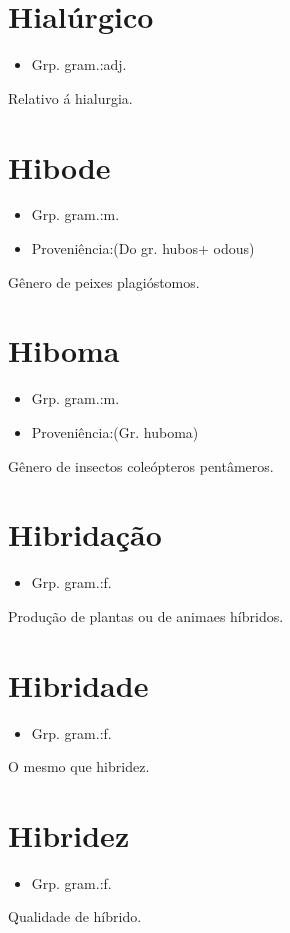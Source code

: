 \documentclass{article}
\begin{document}
\section{Hialúrgico}
\begin{itemize}
\item {Grp. gram.:adj.}
\end{itemize}
Relativo á hialurgia.
\section{Hibode}
\begin{itemize}
\item {Grp. gram.:m.}
\end{itemize}
\begin{itemize}
\item {Proveniência:(Do gr. \textunderscore hubos\textunderscore  + \textunderscore odous\textunderscore )}
\end{itemize}
Gênero de peixes plagióstomos.
\section{Hiboma}
\begin{itemize}
\item {Grp. gram.:m.}
\end{itemize}
\begin{itemize}
\item {Proveniência:(Gr. \textunderscore huboma\textunderscore )}
\end{itemize}
Gênero de insectos coleópteros pentâmeros.
\section{Hibridação}
\begin{itemize}
\item {Grp. gram.:f.}
\end{itemize}
Produção de plantas ou de animaes híbridos.
\section{Hibridade}
\begin{itemize}
\item {Grp. gram.:f.}
\end{itemize}
O mesmo que \textunderscore hibridez\textunderscore .
\section{Hibridez}
\begin{itemize}
\item {Grp. gram.:f.}
\end{itemize}
Qualidade de híbrido.
\end{document}
